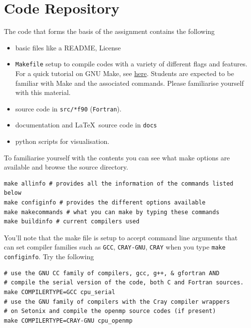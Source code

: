 \section{Code Repository}\label{sec:code}
The code that forms the basis of the assignment contains the following 
\begin{itemize}
	\item basic files like a README, License
	\item \texttt{Makefile} setup to compile codes with a variety of different flags and features. For a quick tutorial on GNU Make, see \href{https://www.gnu.org/software/make/}{here}. Students are expected to be familiar with Make and the associated commands. Please familiarise yourself with this material. 
	\item source code in \texttt{src/*f90} (\texttt{Fortran}). 
	\item documentation and \LaTeX\ source code in \texttt{docs}
	\item python scripts for visualisation. 
\end{itemize}
To familiarise yourself with the contents you can see what make options are available and browse the source directory. 
\begin{center}
\begin{minipage}{0.95\textwidth}
\small
\begin{verbatim}
make allinfo # provides all the information of the commands listed below  
make configinfo # provides the different options available 
make makecommands # what you can make by typing these commands
make buildinfo # current compilers used
\end{verbatim}
\end{minipage}
\end{center}
You'll note that the make file is setup to accept command line arguments that can set compiler families such as \texttt{GCC}, \texttt{CRAY-GNU}, \texttt{CRAY} when you type \texttt{make configinfo}. Try the following
\begin{center}
\begin{minipage}{0.95\textwidth}
\small
\begin{verbatim}
# use the GNU CC family of compilers, gcc, g++, & gfortran AND 
# compile the serial version of the code, both C and Fortran sources.
make COMPILERTYPE=GCC cpu_serial 
# use the GNU family of compilers with the Cray compiler wrappers 
# on Setonix and compile the openmp source codes (if present)
make COMPILERTYPE=CRAY-GNU cpu_openmp 
\end{verbatim}
\end{minipage}
\end{center}


